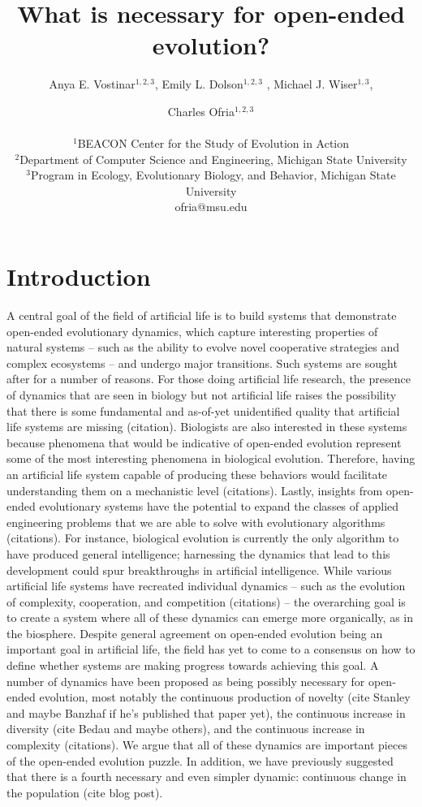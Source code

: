 \documentclass[letterpaper]{article}
\title{What is necessary for open-ended evolution?}
\author{Anya E. Vostinar$^{1,2,3}$, Emily L. Dolson$^{1,2,3}$ , Michael J. Wiser$^{1,3}$, \and Charles Ofria$^{1,2,3}$ \\
\mbox{}\\
$^1$BEACON Center for the Study of Evolution in Action  \\
$^2$Department of Computer Science and Engineering, Michigan State University \\
$^3$Program in Ecology, Evolutionary Biology, and Behavior, Michigan State University \\
ofria@msu.edu}
\begin{document}
\maketitle


\section{Introduction}

    A central goal of the field of artificial life is to build systems that demonstrate open-ended evolutionary dynamics, which capture interesting properties of natural systems -- such as the ability to evolve novel cooperative strategies and complex ecosystems -- and undergo major transitions. Such systems are sought after for a number of reasons. For those doing artificial life research, the presence of dynamics that are seen in biology but not artificial life raises the possibility that there is some fundamental and as-of-yet unidentified quality that artificial life systems are missing (citation). Biologists are also interested in these systems because phenomena that would be indicative of open-ended evolution represent some of the most interesting phenomena in biological evolution. Therefore, having an artificial life system capable of producing these behaviors would facilitate understanding them on a mechanistic level (citations). Lastly, insights from open-ended evolutionary systems have the potential to expand the classes of applied engineering problems that we are able to solve with evolutionary algorithms (citations). For instance, biological evolution is currently the only algorithm to have produced general intelligence; harnessing the dynamics that lead to this development could spur breakthroughs in artificial intelligence. While various artificial life systems have recreated individual dynamics -- such as the evolution of complexity, cooperation, and competition (citations) --  the overarching goal is to create a system where all of these dynamics can emerge more organically, as in the biosphere. 
Despite general agreement on open-ended evolution being an important goal in artificial life, the field has yet to come to a consensus on how to define whether systems are making progress towards achieving this goal. A number of dynamics have been proposed as being possibly necessary for open-ended evolution, most notably the continuous production of novelty (cite Stanley and maybe Banzhaf if he’s published that paper yet), the continuous increase in diversity (cite Bedau and maybe others), and the continuous increase in complexity (citations). We argue that all of these dynamics are important pieces of the open-ended evolution puzzle. In addition, we have previously suggested that there is a fourth necessary and even simpler dynamic: continuous change in the population (cite blog post).
\end{document}
